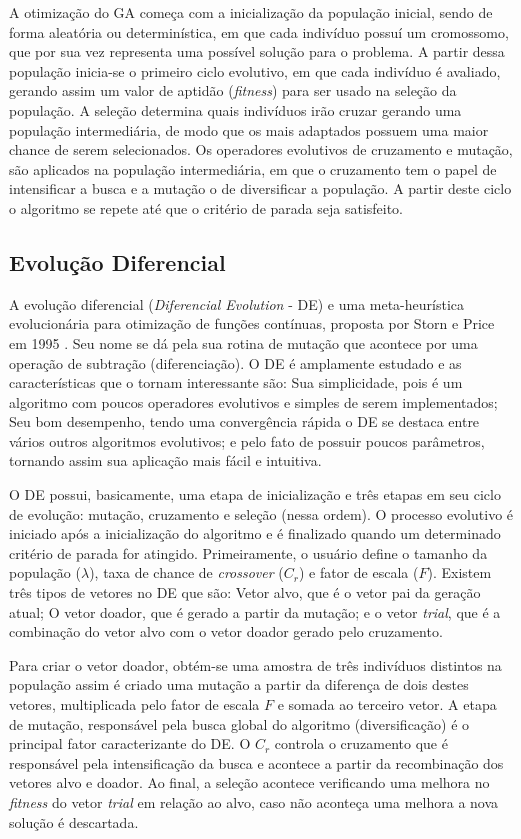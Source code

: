 A otimização do GA começa com a inicialização da população inicial, sendo de forma aleatória ou determinística, em que cada indivíduo possuí um cromossomo, que por sua vez representa uma possível solução para o problema. A partir dessa população inicia-se o primeiro ciclo evolutivo, em que cada indivíduo é avaliado, gerando assim um valor de aptidão (\textit{fitness}) para ser usado na seleção da população. A seleção determina quais indivíduos irão cruzar gerando uma população intermediária, de modo que os mais adaptados possuem uma maior chance de serem selecionados. Os operadores evolutivos de cruzamento e mutação, são aplicados na população intermediária, em que o cruzamento tem o papel de intensificar a busca e a mutação o de diversificar a população. A partir deste ciclo o algoritmo se repete até que o critério de parada seja satisfeito.

\subsection{Evolução Diferencial}
\label{sec:diferencial_evolution}
A evolução diferencial (\textit{Diferencial Evolution} - DE) e uma meta-heurística evolucionária para otimização de funções contínuas, proposta por Storn e Price em 1995 \cite{de}. Seu nome se dá pela sua rotina de mutação que acontece por uma operação de subtração (diferenciação). O DE é amplamente estudado e as características que o tornam interessante são: Sua simplicidade, pois é um algoritmo com poucos operadores evolutivos e simples de serem implementados; Seu bom desempenho, tendo uma convergência rápida o DE se destaca entre vários outros algoritmos evolutivos; e pelo fato de possuir poucos parâmetros, tornando assim sua aplicação mais fácil e intuitiva.

O DE possui, basicamente, uma etapa de inicialização e três etapas em seu ciclo de evolução: mutação, cruzamento e seleção (nessa ordem). O processo evolutivo é iniciado após a inicialização do algoritmo e é finalizado quando um determinado critério de parada for atingido. Primeiramente, o usuário define o tamanho da população ($\lambda$), taxa de chance de \textit{crossover} ($C_r$) e fator de escala ($F$). Existem três tipos de vetores no DE que são: Vetor alvo, que é o vetor pai da geração atual; O vetor doador, que é gerado a partir da mutação; e o vetor \textit{trial}, que é a combinação do vetor alvo com o vetor doador gerado pelo cruzamento. 

Para criar o vetor doador, obtém-se uma amostra de três indivíduos distintos na população assim é criado uma mutação a partir da diferença de dois destes vetores, multiplicada pelo fator de escala $F$ e somada ao terceiro vetor. A etapa de mutação, responsável pela busca global do algoritmo (diversificação) é o principal fator caracterizante do DE. O $C_r$ controla o cruzamento que é responsável pela intensificação da busca e acontece a partir da recombinação dos vetores alvo e doador. Ao final, a seleção acontece verificando uma melhora no \textit{fitness} do vetor \textit{trial} em relação ao alvo, caso não aconteça uma melhora a nova solução é descartada.

